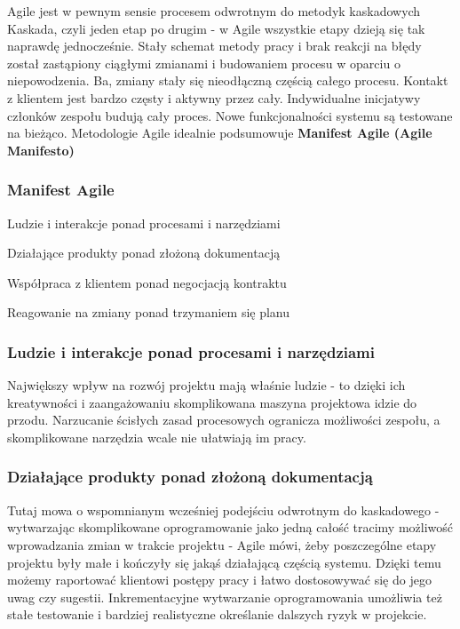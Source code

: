 \documentclass{article}
\begin{document}
Agile jest w pewnym sensie procesem odwrotnym do metodyk kaskadowych\cite{scrum} Kaskada, czyli jeden etap po drugim - w Agile wszystkie etapy dzieją się tak naprawdę jednocześnie. Stały schemat metody pracy i brak reakcji na błędy został zastąpiony ciągłymi zmianami i budowaniem procesu w oparciu o niepowodzenia. Ba, zmiany stały się nieodłączną częścią całego procesu. Kontakt z klientem jest bardzo częsty i aktywny przez cały. Indywidualne inicjatywy członków zespołu budują cały proces. Nowe funkcjonalności systemu są testowane na bieżąco. Metodologie Agile idealnie podsumowuje \textbf{Manifest Agile (Agile Manifesto)}

\subsubsection{Manifest Agile}

\begin{center}
    Ludzie i interakcje ponad procesami i narzędziami

    Działające produkty ponad złożoną dokumentacją

    Współpraca z klientem ponad negocjacją kontraktu

    Reagowanie na zmiany ponad trzymaniem się planu\cite{scrum}
\end{center}

\subsubsection*{Ludzie i interakcje ponad procesami i narzędziami}
Największy wpływ na rozwój projektu mają właśnie ludzie - to dzięki ich kreatywności i zaangażowaniu skomplikowana maszyna projektowa idzie do przodu. Narzucanie ścisłych zasad procesowych ogranicza możliwości zespołu, a skomplikowane narzędzia wcale nie ułatwiają im pracy.

\subsubsection*{Działające produkty ponad złożoną dokumentacją}
Tutaj mowa o wspomnianym wcześniej podejściu odwrotnym do kaskadowego - wytwarzając skomplikowane oprogramowanie jako jedną całość tracimy możliwość wprowadzania zmian w trakcie projektu - Agile mówi, żeby poszczególne etapy projektu były małe i kończyły się jakąś działającą częścią systemu. Dzięki temu możemy raportować klientowi postępy pracy i łatwo dostosowywać się do jego uwag czy sugestii. Inkrementacyjne wytwarzanie oprogramowania umożliwia też stałe testowanie i bardziej realistyczne określanie dalszych ryzyk w projekcie.
\end{document}
